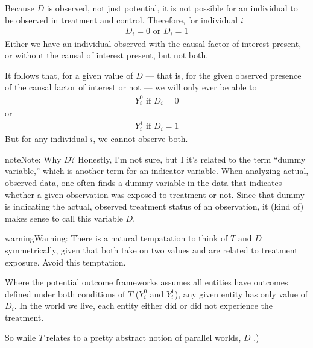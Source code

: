 \documentclass[letterpaper,10pt,english]{jupyterBook}
\begin{document}
\sphinxAtStartPar
Because \(D\) is observed, not just potential, it is not possible for an individual to  be observed in treatment and control. Therefore, for individual \(i\)
\begin{equation*}
\begin{split}D_{i} = 0 \text{ or } D_{i} = 1\end{split}
\end{equation*}
\sphinxAtStartPar
Either we have an individual observed with the causal factor of interest present, or without the causal of interest present, but not both.

\sphinxAtStartPar
It follows that, for a given value of \(D\) — that is, for the given observed presence of the causal factor of interest or not — we will only ever be able to 
\begin{equation*}
\begin{split}Y^0_i  \text{ if } D_{i} = 0\end{split}
\end{equation*}
\sphinxAtStartPar
or
\begin{equation*}
\begin{split}Y^1_i  \text{ if } D_{i} = 1\end{split}
\end{equation*}
\sphinxAtStartPar
But for any individual \(i\), we cannot observe both.

\begin{sphinxadmonition}{note}{Note:}
\sphinxAtStartPar
Why \(D\)? Honestly, I’m not sure, but I  it’s related to the term “dummy variable,” which is another term for an indicator variable. When analyzing actual, observed data, one often finds a dummy variable in the data that indicates whether a given observation was exposed to treatment or not. Since that dummy is indicating the actual, observed treatment status of an observation, it (kind of) makes sense to call this variable \(D\).
\end{sphinxadmonition}

\begin{sphinxadmonition}{warning}{Warning:}
\sphinxAtStartPar
There is a natural tempatation to think of \(T\) and \(D\) symmetrically, given that both take on two values and are related to treatment exposure. Avoid this temptation.

\sphinxAtStartPar
Where the potential outcome frameworks assumes all entities have outcomes defined under both conditions of \(T\) (\(Y^0_i\) and \(Y^1_i\)), any given entity has only  value of \(D_i\). In the world we live, each entity either did or did not experience the treatment.

\sphinxAtStartPar
So while \(T\) relates to a pretty abstract notion of parallel worlds, \(D\) .)
\end{sphinxadmonition}
\end{document}
